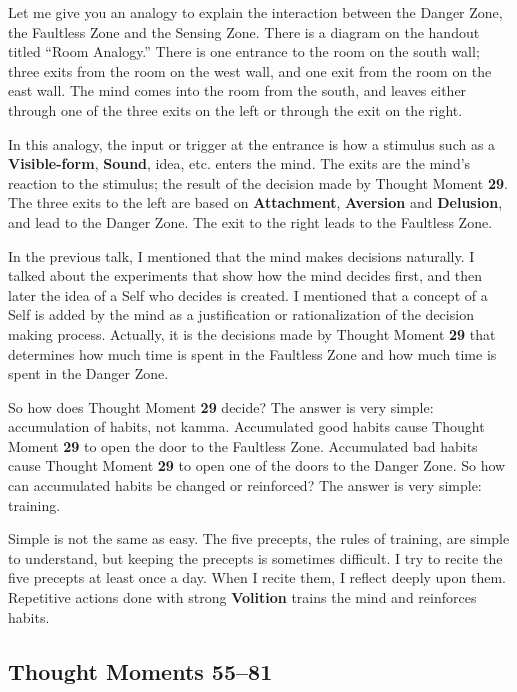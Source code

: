 Let me give you an analogy to explain the interaction between the Danger Zone, the Faultless Zone and the Sensing Zone. There is a diagram on the handout titled “Room Analogy.” There is one entrance to the room on the south wall; three exits from the room on the west wall, and one exit from the room on the east wall. The mind comes into the room from the south, and leaves either through one of the three exits on the left or through the exit on the right.

In this analogy, the input or trigger at the entrance is how a stimulus such as a \textbf{Visible-form}, \textbf{Sound}, idea, etc. enters the mind. The exits are the mind’s reaction to the stimulus; the result of the decision made by Thought Moment \textbf{29}. The three exits to the left are based on \textbf{Attachment}, \textbf{Aversion} and \textbf{Delusion}, and lead to the Danger Zone. The exit to the right leads to the Faultless Zone.

In the previous talk, I mentioned that the mind makes decisions naturally. I talked about the experiments that show how the mind decides first, and then later the idea of a Self who decides is created. I mentioned that a concept of a Self is added by the mind as a justification or rationalization of the decision making process. Actually, it is the decisions made by Thought Moment \textbf{29} that determines how much time is spent in the Faultless Zone and how much time is spent in the Danger Zone.

So how does Thought Moment \textbf{29} decide? The answer is very simple: accumulation of habits, not kamma. Accumulated good habits cause Thought Moment \textbf{29} to open the door to the Faultless Zone. Accumulated bad habits cause Thought Moment \textbf{29} to open one of the doors to the Danger Zone. So how can accumulated habits be changed or reinforced? The answer is very simple: training.

Simple is not the same as easy. The five precepts, the rules of training, are simple to understand, but keeping the precepts is sometimes difficult. I try to recite the five precepts at least once a day. When I recite them, I reflect deeply upon them. Repetitive actions done with strong \textbf{Volition} trains the mind and reinforces habits.

\subsection*{Thought Moments 55--81}

